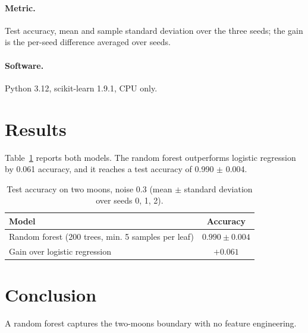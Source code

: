 \documentclass[11pt]{article}
\begin{document}
\paragraph{Metric.} Test accuracy, mean and sample standard deviation over the three seeds; the
gain is the per-seed difference averaged over seeds.
\paragraph{Software.} Python 3.12, scikit-learn 1.9.1, CPU only.

\section{Results}
Table~\ref{tab:moons} reports both models. The random forest outperforms logistic regression by
0.061 accuracy, and it reaches a test accuracy of 0.990 $\pm$ 0.004.

\begin{table}[t]
\centering
\caption{Test accuracy on two moons, noise 0.3 (mean $\pm$ standard deviation over seeds 0, 1, 2).}
\label{tab:moons}
\begin{tabular}{lc}
\toprule
Model & Accuracy \\
\midrule
Random forest (200 trees, min. 5 samples per leaf) & $0.990 \pm 0.004$ \\
\midrule
Gain over logistic regression & $+0.061$ \\
\bottomrule
\end{tabular}
\end{table}

\section{Conclusion}
A random forest captures the two-moons boundary with no feature engineering.
\end{document}
